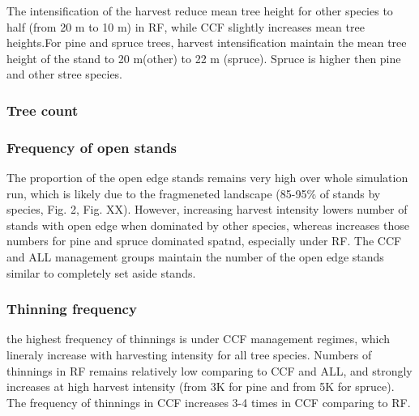 \documentclass[]{elsarticle} %
\begin{document}
The intensification of the harvest reduce mean tree height for other species to half (from 20 m to 10 m) in RF, while CCF slightly increases mean tree heights.For pine and spruce trees, harvest intensification maintain the mean tree height of the stand to 20 m(other) to 22 m (spruce). Spruce is higher then pine and other stree species.

\hypertarget{tree-count}{%
\subsubsection{Tree count}\label{tree-count}}

\hypertarget{frequency-of-open-stands}{%
\subsubsection{Frequency of open stands}\label{frequency-of-open-stands}}

The proportion of the open edge stands remains very high over whole simulation run, which is likely due to the fragmeneted landscape (85-95\% of stands by species, Fig. 2, Fig. XX). However, increasing harvest intensity lowers number of stands with open edge when dominated by other species, whereas increases those numbers for pine and spruce dominated spatnd, especially under RF. The CCF and ALL management groups maintain the number of the open edge stands similar to completely set aside stands.

\hypertarget{thinning-frequency}{%
\subsubsection{Thinning frequency}\label{thinning-frequency}}

the highest frequency of thinnings is under CCF management regimes, which lineraly increase with harvesting intensity for all tree species. Numbers of thinnings in RF remains relatively low comparing to CCF and ALL, and strongly increases at high harvest intensity (from 3K for pine and from 5K for spruce). The frequency of thinnings in CCF increases 3-4 times in CCF comparing to RF.
\end{document}
